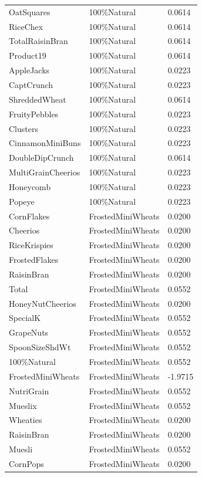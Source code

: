 \begin{table}[!htbp]
\begin{tabular}{lll}
\\
OatSquares & 100\%Natural & 0.0614
\\
RiceChex & 100\%Natural & 0.0614
\\
TotalRaisinBran & 100\%Natural & 0.0614
\\
Product19 & 100\%Natural & 0.0614
\\
AppleJacks & 100\%Natural & 0.0223
\\
CaptCrunch & 100\%Natural & 0.0223
\\
ShreddedWheat & 100\%Natural & 0.0614
\\
FruityPebbles & 100\%Natural & 0.0223
\\
Clusters & 100\%Natural & 0.0223
\\
CinnamonMiniBuns & 100\%Natural & 0.0223
\\
DoubleDipCrunch & 100\%Natural & 0.0614
\\
MultiGrainCheerios & 100\%Natural & 0.0223
\\
Honeycomb & 100\%Natural & 0.0223
\\
Popeye & 100\%Natural & 0.0223
\\
CornFlakes & FrostedMiniWheats & 0.0200
\\
Cheerios & FrostedMiniWheats & 0.0200
\\
RiceKrispies & FrostedMiniWheats & 0.0200
\\
FrostedFlakes & FrostedMiniWheats & 0.0200
\\
RaisinBran & FrostedMiniWheats & 0.0200
\\
Total & FrostedMiniWheats & 0.0552
\\
HoneyNutCheerios & FrostedMiniWheats & 0.0200
\\
SpecialK & FrostedMiniWheats & 0.0552
\\
GrapeNuts & FrostedMiniWheats & 0.0552
\\
SpoonSizeShdWt & FrostedMiniWheats & 0.0552
\\
100\%Natural & FrostedMiniWheats & 0.0552
\\
FrostedMiniWheats & FrostedMiniWheats & -1.9715
\\
NutriGrain & FrostedMiniWheats & 0.0552
\\
Mueslix & FrostedMiniWheats & 0.0552
\\
Wheaties & FrostedMiniWheats & 0.0200
\\
RaisinBran & FrostedMiniWheats & 0.0200
\\
Muesli & FrostedMiniWheats & 0.0552
\\
CornPops & FrostedMiniWheats & 0.0200

\end{tabular}
\end{table}
